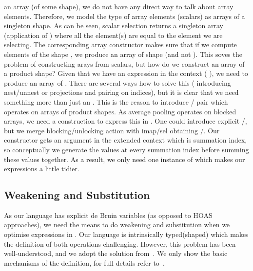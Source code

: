 an array (of some shape), we do not have any direct way to talk about array elements.
Therefore, we model the type of array elements (scalars) as arrays of a singleton shape.
As can be seen, scalar selection  returns a singleton array
(application of ) where all the element(s) are equal to the element we are
selecting.  The corresponding array constructor  makes sure that if we
compute  elements of the shape , we produce an array of shape 
(and not   ).  This soves the problem of constructing arays
from scalars, but how do we construct an array of a product shape?  Given that we
have an expression in the context (      ),
we need to produce an array of   .  There are several ways how to
solve this (\eg{} introducing nest/unnest or projections and pairing on indices),
but it is clear that we need something more than just an .
This is the reason to introduce / pair which operates on arrays
of product shapes.  As average pooling operates on blocked arrays, we need
a construction to express this in .  One could introduce explicit 
/, but we merge blocking/unlocking action with
imap/sel obtaining /.  Our  constructor 
gets an argument in the extended context which is summation index, so 
conceptually we generate the values at every summation index before
summing these values together.  As a result, we only need
one instance of  which makes our expressions a little tidier.




\subsection{Weakening and Substitution}

As our language has explicit de Bruin variables (as opposed to HOAS~\cite{hoas} approaches),
we need the means to do weakening and substitution when we optimise expressions in .
Our language is intrinsically typed(shaped) which
makes the definition of both operations challenging.  However, this problem has
been well-understood, and we adopt the solution from~\cite{subst}.  We only show the
basic mechanisms of the definition, for full details refer to~\cite{subst}.

